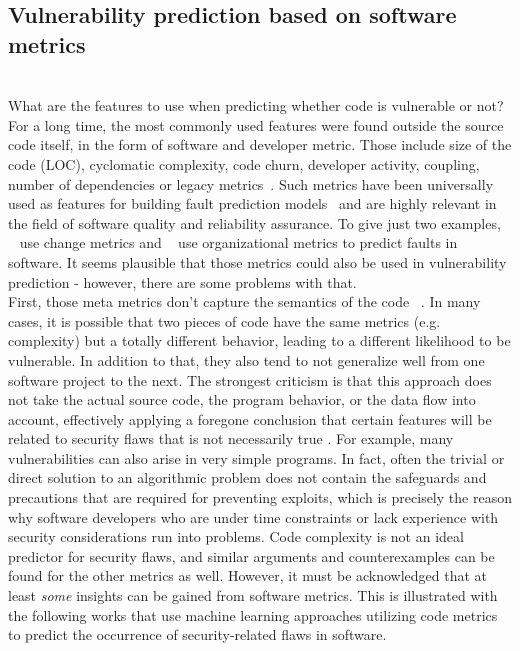 \documentclass[
a4paper,
pagesize,
pdftex,
12pt,
twoside, %
BCOR=5mm, %
ngerman,
fleqn,
final,
]{scrartcl}
\begin{document}
	\subsection{Vulnerability prediction based on software metrics}\mbox{}\\
	What are the features to use when predicting whether code is vulnerable or not? For a long time, the most commonly used features were found outside the source code itself, in the form of software and developer metric. Those include size of the code (LOC), cyclomatic complexity, code churn, developer activity, coupling, number of dependencies or legacy metrics~\cite{Morrison.2015}. Such metrics have been universally used as features for building fault prediction models~\cite{Hall.2011} and are highly relevant in the field of software quality and reliability assurance.  To give just two examples, ~\cite{ACM.2008b} use change metrics and ~\cite{Nagappan.2008} use organizational metrics to predict faults in software. It seems plausible that those metrics could also be used in vulnerability prediction - however, there are some problems with that.\\
	First, those meta metrics don't capture the semantics of the code ~\cite{Shin.2008}. In many cases, it is possible that two pieces of code have the same metrics (e.g. complexity) but a totally different behavior, leading to a different likelihood to be vulnerable. In addition to that, they also tend to not generalize well from one software project to the next. The strongest criticism is that this approach does not take the actual source code, the program behavior, or the data flow into account, effectively applying a foregone conclusion that certain features will be related to security flaws that is not necessarily true \citep{Hovsepyan.2012}. For example, many vulnerabilities can also arise in very simple programs. In fact, often the trivial or direct solution to an algorithmic problem does not contain the safeguards and precautions that are required for preventing exploits, which is precisely the reason why software developers who are under time constraints or lack experience with security considerations run into problems. Code complexity is not an ideal predictor for security flaws, and similar arguments and counterexamples can be found for the other metrics as well. However, it must be acknowledged that at least \textit{some} insights can be gained from software metrics. This is illustrated with the following works that use machine learning approaches utilizing code metrics to predict the occurrence of security-related flaws in software.\\
\end{document}

